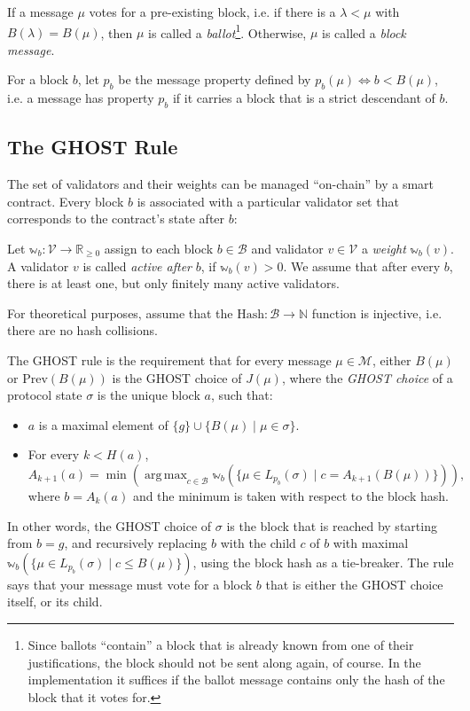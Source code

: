\documentclass[12pt]{article}
\DeclareMathOperator*{\argmax}{arg\,max}
\begin{document}
If a message $\mu$ votes for a pre-existing block, i.e. if there is a $\lambda < \mu$ with $B(\lambda) = B(\mu)$, then $\mu$ is called a \emph{ballot}\footnote{Since ballots ``contain'' a block that is already known from one of their justifications, the block should not be sent along again, of course. In the implementation it suffices if the ballot message contains only the hash of the block that it votes for.}. Otherwise, $\mu$ is called a \emph{block message}.

For a block $b$, let $p_b$ be the message property defined by $p_b (\mu) \Leftrightarrow b < B(\mu)$, i.e. a message has property $p_b$ if it carries a block that is a strict descendant of $b$.


\subsection{The GHOST Rule}

The set of validators and their weights can be managed ``on-chain'' by a smart contract. Every block $b$ is associated with a particular validator set that corresponds to the contract's state after $b$:

Let $\mathbb{w}_b : \mathcal{V} \rightarrow \mathbb{R}_{\geq 0}$ assign to each block $b \in \mathcal{B}$ and validator $v \in \mathcal{V}$ a \emph{weight} $\mathbb{w}_b(v)$. A validator $v$ is called \emph{active after} $b$, if $\mathbb{w}_b(v) > 0$. We assume that after every $b$, there is at least one, but only finitely many active validators.

For theoretical purposes, assume that the $\mathrm{Hash} : \mathcal{B} \rightarrow \mathbb{N}$ function is injective, i.e. there are no hash collisions.

The GHOST rule is the requirement that for every message $\mu \in \mathcal{M}$, either $B(\mu)$ or $\mathrm{Prev}(B(\mu))$ is the GHOST choice of $J(\mu)$, where the \emph{GHOST choice} of a protocol state $\sigma$ is the unique block $a$, such that:
\begin{itemize}
    \item $a$ is a maximal element of $\{g\} \cup \{ B(\mu) \mid \mu \in \sigma\}$.
    \item For every $k < H(a)$,
      $$A_{k + 1}(a) = \min \left(\argmax_{c\in\mathcal{B}} \mathbb{w}_b(\{\mu \in L_{p_b} (\sigma) \mid c = A_{k + 1}(B(\mu))\})\right)\textrm{,}$$
      where $b = A_k(a)$ and the minimum is taken with respect to the block hash.
\end{itemize}
In other words, the GHOST choice of $\sigma$ is the block that is reached by starting from $b = g$, and recursively replacing $b$ with the child $c$ of $b$ with maximal $\mathbb{w}_{b} (\{\mu \in L_{p_b}(\sigma) \mid c \leq B(\mu) \})$, using the block hash as a tie-breaker. The rule says that your message must vote for a block $b$ that is either the GHOST choice itself, or its child.
\end{document}
